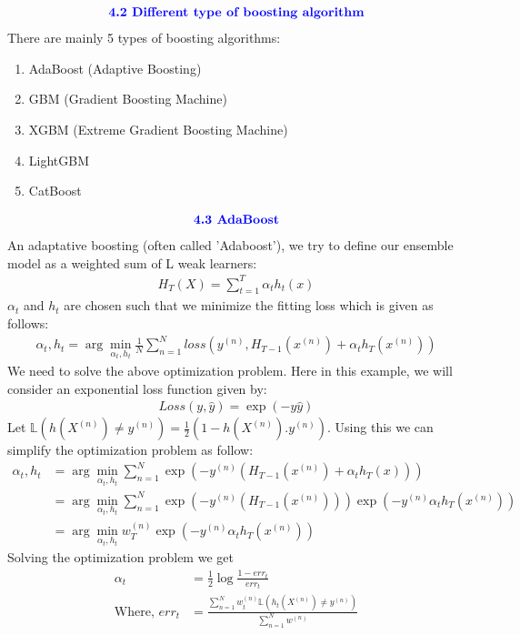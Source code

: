 \documentclass{homework}
\begin{document}
\begin{align*}
    \textcolor{blue}{ \text{{\textbf{4.2 Different type of boosting algorithm}}}}
 \end{align*}
There are mainly 5 types of boosting algorithms:
\begin{enumerate}
    \item AdaBoost (Adaptive Boosting)
    \item GBM (Gradient Boosting Machine)
    \item XGBM (Extreme Gradient Boosting Machine)
    \item LightGBM
    \item CatBoost
\end{enumerate}

\begin{align*}
    \textcolor{blue}{ \text{{\textbf{4.3 AdaBoost}}}}
 \end{align*}
 An adaptative boosting (often called 'Adaboost'), we try to define our ensemble model as a weighted sum of L weak learners: 
 \begin{align*}
    H_T(X) = \sum_{t=1}^{T}\alpha_t h_t(x)
 \end{align*}
 $\alpha_t$ and $h_t$ are chosen such that we minimize the fitting loss which is given as follows:
 \begin{align*}
    \alpha_t,h_t = \arg \min_{\alpha_t,h_t} \frac{1}{N} \sum_{n=1}^{N} loss(y^{(n)},H_{T-1}(x^{(n)}) + \alpha_t h_T(x^{(n)}))
 \end{align*}
 We need to solve the above optimization problem. Here in this example, we will consider an exponential loss function given by:
 \begin{align*}
    Loss(y,\hat{y}) = \exp(-y\hat{y})
 \end{align*}
 Let $\mathbb{L}(h(X^{(n)}) \neq y^{(n)}) = \frac{1}{2}(1 - h(X^{(n)}).y^{(n)})$. Using this we can simplify the optimization problem as follow:
 \begin{align*}
    \alpha_t,h_t &= \arg \min_{\alpha_t,h_t} \sum_{n=1}^{N} \exp(-y^{(n)}(H_{T-1}(x^{(n)}) + \alpha_t h_T(x))) \\
    &= \arg \min_{\alpha_t,h_t} \sum_{n=1}^{N} \exp(-y^{(n)}(H_{T-1}(x^{(n)}))) \exp(-y^{(n)}\alpha_t h_T(x^{(n)})) \\
    &= \arg \min_{\alpha_t,h_t} w_T^{(n)} \exp(-y^{(n)}\alpha_t h_T(x^{(n)}))
 \end{align*}
 Solving the optimization problem we get 
 \begin{align*}
    \alpha_t &= \frac{1}{2} \log \frac{1 - err_t}{err_t} \\
    \text{Where, } err_t &= \frac{\sum_{n=1}^{N}w_t^{(n)}\mathbb{L}(h_t(X^{(n)}) \neq y^{(n)})}{\sum_{n=1}^{N}w^{(n)}} \\
 \end{align*}
\end{document}
